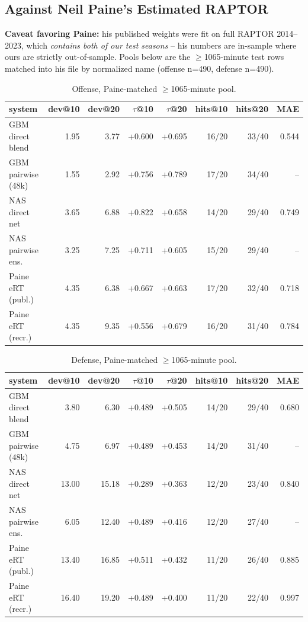 \documentclass[10pt]{article}
\begin{document}
\subsection{Against Neil Paine's Estimated RAPTOR}
\textbf{Caveat favoring Paine:} his published weights were fit on full RAPTOR 2014--2023, which \emph{contains both of our test seasons} -- his numbers are in-sample where ours are strictly out-of-sample. Pools below are the $\geq$1065-minute test rows matched into his file by normalized name (offense n=490, defense n=490).
\begin{table}[ht]\centering\small
\caption{Offense, Paine-matched $\geq$1065-minute pool.}\label{tab:paine-offense}
\begin{tabular}{lrrrrrrr}
\toprule
system & dev@10 & dev@20 & $\tau$@10 & $\tau$@20 & hits@10 & hits@20 & MAE \\
\midrule
GBM direct blend & 1.95 & 3.77 & +0.600 & +0.695 & 16/20 & 33/40 & 0.544 \\
GBM pairwise (48k) & 1.55 & 2.92 & +0.756 & +0.789 & 17/20 & 34/40 & -- \\
NAS direct net & 3.65 & 6.88 & +0.822 & +0.658 & 14/20 & 29/40 & 0.749 \\
NAS pairwise ens. & 3.25 & 7.25 & +0.711 & +0.605 & 15/20 & 29/40 & -- \\
Paine eRT (publ.) & 4.35 & 6.38 & +0.667 & +0.663 & 17/20 & 32/40 & 0.718 \\
Paine eRT (recr.) & 4.35 & 9.35 & +0.556 & +0.679 & 16/20 & 31/40 & 0.784 \\
\bottomrule
\end{tabular}
\end{table}
\begin{table}[ht]\centering\small
\caption{Defense, Paine-matched $\geq$1065-minute pool.}\label{tab:paine-defense}
\begin{tabular}{lrrrrrrr}
\toprule
system & dev@10 & dev@20 & $\tau$@10 & $\tau$@20 & hits@10 & hits@20 & MAE \\
\midrule
GBM direct blend & 3.80 & 6.30 & +0.489 & +0.505 & 14/20 & 29/40 & 0.680 \\
GBM pairwise (48k) & 4.75 & 6.97 & +0.489 & +0.453 & 14/20 & 31/40 & -- \\
NAS direct net & 13.00 & 15.18 & +0.289 & +0.363 & 12/20 & 23/40 & 0.840 \\
NAS pairwise ens. & 6.05 & 12.40 & +0.489 & +0.416 & 12/20 & 27/40 & -- \\
Paine eRT (publ.) & 13.40 & 16.85 & +0.511 & +0.432 & 11/20 & 26/40 & 0.885 \\
Paine eRT (recr.) & 16.40 & 19.20 & +0.489 & +0.400 & 11/20 & 22/40 & 0.997 \\
\bottomrule
\end{tabular}
\end{table}
\end{document}
